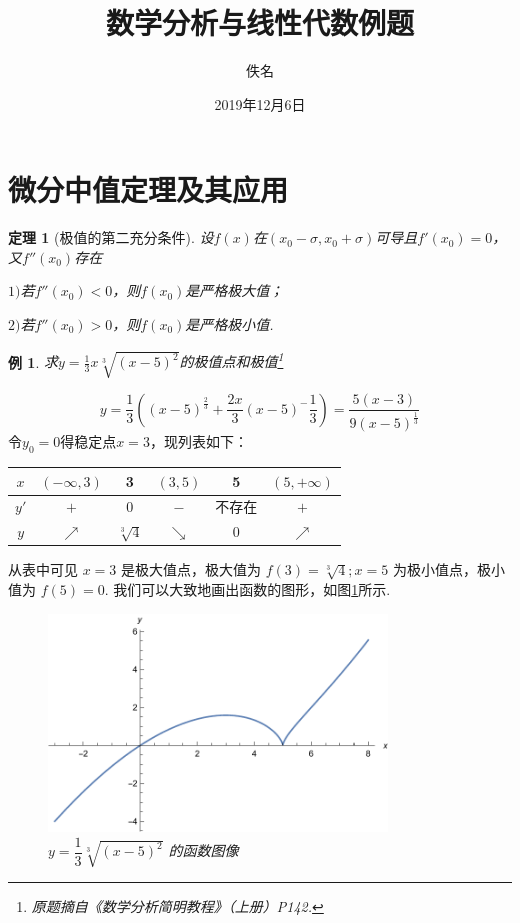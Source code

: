 \documentclass[UTF8,11pt]{ctexart} %
\title{数学分析与线性代数例题}
\author{佚名}
\date{2019年12月6日}
\newtheorem{theorem}{定理}
\newtheorem{example}{例}
\begin{document}
\maketitle

\tableofcontents

\section{微分中值定理及其应用}
\begin{theorem}[极值的第二充分条件]
设$f(x)$在$(x_0-\sigma , x_0 + \sigma )$可导且$f'(x_0)=0$，又$f''(x_0)$存在

$1)$若$f''(x_0)<0$，则$f(x_0)$是严格极大值； 

$2)$若$f''(x_0)>0$，则$f(x_0)$是严格极小值.
\end{theorem}

\begin{example}
求$y=\frac{1}{3}x\sqrt[3]{(x-5)^2}$的极值点和极值\footnote{原题摘自《数学分析简明教程》（上册）P142.}
\end{example}
\begin{equation}
y=\frac{1}{3}( (x-5) ^\frac{2}{3}+\frac{2x}{3}(x-5) ^-\frac{1}{3}) = \frac{5(x-3)}{9(x-5)^\frac{1}{3}}  
\end{equation}
令$y_0=0$得稳定点$x=3$，现列表如下：
\begin{center}
    \begin{tabular}{|c|c|c|c|c|c|}
        \hline
        $x$ & $(-\infty,3)$ & 3 & $(3,5)$ & 5 & $(5,+\infty)$ \\
        \hline
        $y'$ & $+$ & 0 & $-$ & 不存在 & $+$ \\
        \hline
        $y$ & $\nearrow$ & $\sqrt[3]{4}$ & $\searrow$ & 0 & $\nearrow$ \\
        \hline  
    \end{tabular}
\end{center}
\kaishu 从表中可见 $x = 3$ 是极大值点，极大值为 $f(3) = \sqrt[3]{4};x = 5$ 为极小值点，极小值为 $f(5) = 0$. 我们可以大致地画出函数的图形，如图\ref{fig:function}所示.
\newpage
\begin{figure}[ht]
\begin{center}
\includegraphics[width=9cm]{fig/function.pdf}
\caption{\small\it  $y=\dfrac{1}{3}\sqrt[3]{(x−5)^2}$  的函数图像}
\label{fig:function}
\end{center}
\end{figure}
\end{document}

